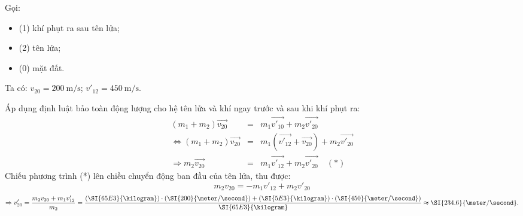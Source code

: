 \begin{enumerate}[label=\bfseries Câu \arabic*:, leftmargin=1.5cm]
	\hideall
	{	Gọi:
		\begin{itemize}
			\item (1) khí phụt ra sau tên lửa;
			\item (2) tên lửa;
			\item (0) mặt đất.
		\end{itemize}
		Ta có: $v_{20}=\SI{200}{\meter/\second}$; $v'_{12}=\SI{450}{\meter/\second}$.
		
		Áp dụng định luật bảo toàn động lượng cho hệ tên lửa và khí ngay trước và sau khi khí phụt ra:
		\begin{eqnarray*}
			\left(m_1+m_2\right)\overrightarrow{v_{20}}&=&m_1\overrightarrow{v'_{10}}+m_2\overrightarrow{v'_{20}}\\
			\Leftrightarrow \left(m_1+m_2\right)\overrightarrow{v_{20}}&=&m_1\left(\overrightarrow{v'_{12}}+\overrightarrow{v_{20}}\right)+m_2\overrightarrow{v'_{20}}\\
			\Rightarrow m_2\overrightarrow{v_{20}}&=&m_1\overrightarrow{v'_{12}}+m_2\overrightarrow{v'_{20}} \quad (*)
		\end{eqnarray*}
		Chiếu phương trình (*) lên chiều chuyển động ban đầu của tên lửa, thu được:
		$$m_2v_{20}=-m_1v'_{12}+m_2v'_{20}$$
		$$\Rightarrow v'_{20}=\dfrac{m_2v_{20}+m_1v'_{12}}{m_2}=\dfrac{\left(\SI{65E3}{\kilogram}\right)\cdot\left(\SI{200}{\meter/\second}\right)+\left(\SI{5E3}{\kilogram}\right)\cdot\left(\SI{450}{\meter/\second}\right)}{\SI{65E3}{\kilogram}}\approx\SI{234.6}{\meter/\second}.$$
	}


\end{enumerate}
